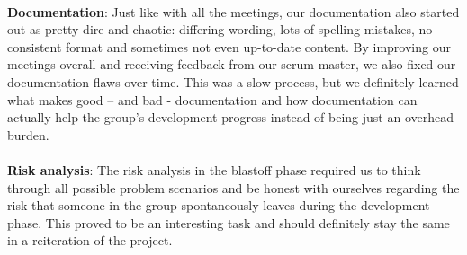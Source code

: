 \ \\
\textbf{Documentation}: Just like with all the meetings, our documentation also started out as pretty dire and chaotic: differing wording, lots of spelling mistakes, no consistent format and sometimes not even up-to-date content. By improving our meetings overall and receiving feedback from our scrum master, we also fixed our documentation flaws over time. This was a slow process, but we definitely learned what makes good – and bad - documentation and how documentation can actually help the group’s development progress instead of being just an overhead-burden. \\
\ \\
\textbf{Risk analysis}: The risk analysis in the blastoff phase required us to think through all possible problem scenarios and be honest with ourselves regarding the risk that someone in the group spontaneously leaves during the development phase. This proved to be an interesting task and should definitely stay the same in a reiteration of the project.\\
